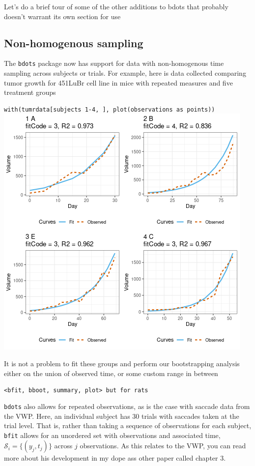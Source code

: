 \documentclass{article}
\begin{document}
Let's do a brief tour of some of the other additions to bdots that probably doesn't warrant its own section for use

\subsection{Non-homogenous sampling}

The \texttt{bdots} package now has support for data with non-homogenous time sampling across subjects or trials. For example, here is data collected comparing tumor growth for 451LuBr cell line in mice with repeated measures and five treatment groups

\begin{center}
\texttt{with(tumrdata[subjects 1-4, ], plot(observations as points))}
\includegraphics[scale=0.75]{img/mouse.png}
\end{center}



It is not a problem to fit these groups and perform our bootstrapping analysis either on the union of observed time, or some custom range in between

\begin{center}
\texttt{<bfit, bboot, summary, plot> but for rats}
\end{center}

\texttt{bdots} also allows for repeated observations, as is the case with saccade data from the VWP. Here, an individual subject has 30 trials with saccades taken at the trial level. That is, rather than taking a sequence of observations for each subject, \texttt{bfit} allows for an unordered set with observations and associated time, $\mathcal{S}_i = \{(y_j, t_j)\}$ across $j$ observations. As this relates to the VWP, you can read more about his development in my dope ass other paper called chapter 3.
\end{document}
